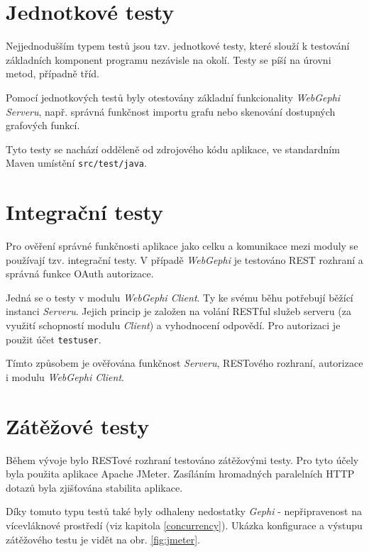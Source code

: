 \documentclass[thesis=M,czech]{FITthesis}[2014/05/6]
\begin{document}
\section{Jednotkové testy}
Nejjednodušším typem testů jsou tzv. jednotkové testy, které slouží k testování
základních komponent programu nezávisle na okolí. Testy se píší na úrovni
metod, případně tříd.

Pomocí jednotkových testů byly otestovány základní funkcionality
\textit{WebGephi Serveru}, např. správná funkčnost importu grafu nebo skenování
dostupných grafových funkcí.

Tyto testy se nachází odděleně od zdrojového kódu aplikace, ve standardním Maven
umístění \texttt{src/test/java}.

\section{Integrační testy}
Pro ověření správné funkčnosti aplikace jako celku a komunikace mezi moduly se
používají tzv. integrační testy. V případě \textit{WebGephi} je testováno REST
rozhraní a správná funkce OAuth autorizace.

Jedná se o testy v modulu \textit{WebGephi Client}. Ty ke svému běhu potřebují
běžící instanci \textit{Serveru}. Jejich princip je založen na volání RESTful
služeb serveru (za využití schopností modulu \textit{Client}) a vyhodnocení
odpovědí. Pro autorizaci je použit účet \texttt{testuser}.

Tímto způsobem je ověřována funkčnost \textit{Serveru}, RESTového rozhraní,
autorizace i modulu \textit{WebGephi Client}.

\section{Zátěžové testy}
Během vývoje bylo RESTové rozhraní testováno zátěžovými testy. Pro tyto účely
byla použita aplikace Apache JMeter\cite{jmeter}. Zasíláním
hromadných paralelních HTTP dotazů byla zjišťována stabilita aplikace. 

Díky tomuto typu testů také byly odhaleny nedostatky \textit{Gephi} -
nepřipravenost na vícevláknové prostředí (viz kapitola \ref{concurrency}).
Ukázka konfigurace a výstupu zátěžového testu je vidět na obr. \ref{fig:jmeter}.
\end{document}
